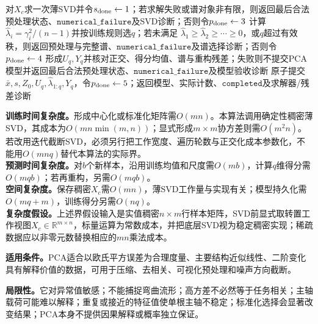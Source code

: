 \begin{AlgorithmContract}
\begin{algorithm}[!t]
对$X_c$求一次薄SVD并令$s_{\rm done}\leftarrow1$；若求解失败或谱对象非有限，则返回最后合法预处理状态、$\mathtt{numerical\_failure}$及SVD诊断；否则令$p_{\rm done}\leftarrow3$\;
计算$\widehat\lambda_i=\gamma_i^2/(n-1)$并按训练规则选$q$；若未满足
$\widehat\lambda_1\ge\widehat\lambda_2\ge\cdots\ge0$，或$q$超过有效秩，则返回预处理与完整谱、$\mathtt{numerical\_failure}$及谱选择诊断；否则令$p_{\rm done}\leftarrow4$\;
形成$U_q,Y_q$并核对正交、得分均值、谱与重构残差；失败则不提交PCA模型并返回最后合法预处理状态、$\mathtt{numerical\_failure}$及模型验收诊断\;
原子提交$\bar x,s,Z_0,U_q,\widehat\lambda_{1:q},Y_q$，令$p_{\rm done}\leftarrow5$；返回模型、实际计数、$\mathtt{completed}$及求解器/残差诊断\;
\end{algorithm}
\end{AlgorithmContract}

\label{struct:V4-C04-CH26}
\label{struct:V4-C04-CH27}
\begin{complexitybox}
\textbf{训练时间复杂度。}形成中心化或标准化矩阵需$O(mn)$。本算法调用确定性稠密薄SVD，其成本为$O(mn\min(m,n))$；显式形成$m\times m$协方差则需$O(m^2n)$。若改用迭代截断SVD，必须另行把工作宽度、遍历轮数与正交化成本参数化，不能用$O(mnq)$替代本算法的实际界。\\
\textbf{预测时间复杂度。}对$b$个新样本，沿用训练均值和尺度需$O(mb)$，计算$q$维得分需$O(mqb)$；若再重构，另需$O(mqb)$。\\
\textbf{空间复杂度。}保存稠密$X_c$需$O(mn)$，薄SVD工作量与实现有关；模型持久化需$O(mq+m)$，训练得分另需$O(nq)$。\\
\textbf{复杂度假设。}上述界假设输入是实值稠密$n\times m$行样本矩阵，SVD前显式取转置工作视图$X_c\in\mathbb R^{m\times n}$，标量运算为常数成本，并把底层SVD视为稳定稠密实现；稀疏数据应以非零元数替换相应的$mn$乘法成本。
\end{complexitybox}

\label{struct:V4-C04-CH28}
\label{struct:V4-C04-CH29}
\begin{applicabilitybox}
\textbf{适用条件。}PCA适合以欧氏平方误差为合理度量、主要结构近似线性、二阶变化具有解释价值的数据，可用于压缩、去相关、可视化预处理和噪声方向截断。

\textbf{局限性。}它对异常值敏感；不能捕捉弯曲流形；高方差不必然等于任务相关；主轴载荷可能难以解释；重复或接近的特征值使单根主轴不稳定；标准化选择会显著改变结果；PCA本身不提供因果解释或概率独立保证。
\end{applicabilitybox}

\label{struct:V4-C04-CH30}

